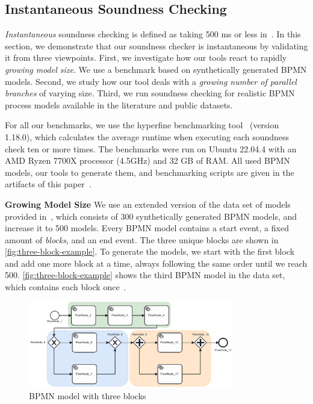 \documentclass[runningheads]{llncs}
\newcommand{\subpart}[1]{\vspace{1em}\noindent\textbf{#1}}
\begin{document}
\subsection{Instantaneous Soundness Checking} \label{subsec:instantaneous}
\textit{Instantaneous} soundness checking is defined as taking 500 ms or less in~\cite{fahlandAnalysisDemandInstantaneous2011}.
In this section, we demonstrate that our soundness checker is instantaneous by validating it from three viewpoints.
First, we investigate how our tools react to rapidly \textit{growing model size}.
We use a benchmark based on synthetically generated BPMN models.
Second, we study how our tool deals with a \textit{growing number of parallel branches} of varying size.
Third, we run soundness checking for realistic BPMN process models available in the literature and public datasets.

For all our benchmarks, we use the hyperfine benchmarking tool~\cite{peterHyperfine2023} (version 1.18.0), which calculates the average runtime when executing each soundness check ten or more times.
The benchmarks were run on Ubuntu 22.04.4 with an AMD Ryzen 7700X processor (4.5GHz) and 32 GB of RAM.
All used BPMN models, our tools to generate them, and benchmarking scripts are given in the artifacts of this paper~\cite{noauthorgivenBPM2024Artifacts2024}.

\subpart{Growing Model Size}
We use an extended version of the data set of models provided in~\cite{krauterHigherorderTransformationApproach2023}, which consists of 300 synthetically generated BPMN models, and increase it to 500 models.
Every BPMN model contains a start event, a fixed amount of \textit{blocks}, and an end event.
The three unique blocks are shown in \autoref{fig:three-block-example}.
To generate the models, we start with the first block and add one more block at a time, always following the same order until we reach 500.
\autoref{fig:three-block-example} shows the third BPMN model in the data set, which contains each block once~\cite{krauterHigherorderTransformationApproach2023}.

\begin{figure}[ht]
	\centering
	\includegraphics[width=0.8\textwidth]{images/three-blocks}
	\caption{BPMN model with three blocks~\cite{krauterHigherorderTransformationApproach2023}}
	\label{fig:three-block-example}
\end{figure}
\end{document}
